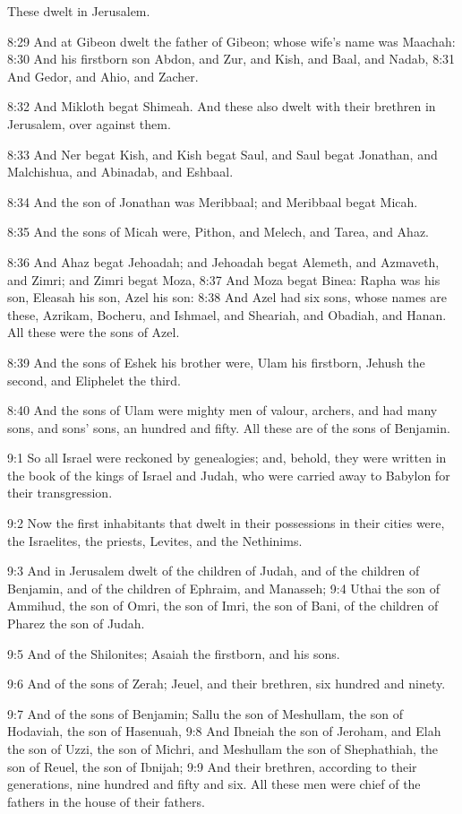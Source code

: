 These dwelt in Jerusalem.

8:29 And at Gibeon dwelt the father of Gibeon; whose wife's name was
Maachah: 8:30 And his firstborn son Abdon, and Zur, and Kish, and
Baal, and Nadab, 8:31 And Gedor, and Ahio, and Zacher.

8:32 And Mikloth begat Shimeah. And these also dwelt with their
brethren in Jerusalem, over against them.

8:33 And Ner begat Kish, and Kish begat Saul, and Saul begat Jonathan,
and Malchishua, and Abinadab, and Eshbaal.

8:34 And the son of Jonathan was Meribbaal; and Meribbaal begat Micah.

8:35 And the sons of Micah were, Pithon, and Melech, and Tarea, and
Ahaz.

8:36 And Ahaz begat Jehoadah; and Jehoadah begat Alemeth, and
Azmaveth, and Zimri; and Zimri begat Moza, 8:37 And Moza begat Binea:
Rapha was his son, Eleasah his son, Azel his son: 8:38 And Azel had
six sons, whose names are these, Azrikam, Bocheru, and Ishmael, and
Sheariah, and Obadiah, and Hanan. All these were the sons of Azel.

8:39 And the sons of Eshek his brother were, Ulam his firstborn,
Jehush the second, and Eliphelet the third.

8:40 And the sons of Ulam were mighty men of valour, archers, and had
many sons, and sons' sons, an hundred and fifty. All these are of the
sons of Benjamin.

9:1 So all Israel were reckoned by genealogies; and, behold, they were
written in the book of the kings of Israel and Judah, who were carried
away to Babylon for their transgression.

9:2 Now the first inhabitants that dwelt in their possessions in their
cities were, the Israelites, the priests, Levites, and the Nethinims.

9:3 And in Jerusalem dwelt of the children of Judah, and of the
children of Benjamin, and of the children of Ephraim, and Manasseh;
9:4 Uthai the son of Ammihud, the son of Omri, the son of Imri, the
son of Bani, of the children of Pharez the son of Judah.

9:5 And of the Shilonites; Asaiah the firstborn, and his sons.

9:6 And of the sons of Zerah; Jeuel, and their brethren, six hundred
and ninety.

9:7 And of the sons of Benjamin; Sallu the son of Meshullam, the son
of Hodaviah, the son of Hasenuah, 9:8 And Ibneiah the son of Jeroham,
and Elah the son of Uzzi, the son of Michri, and Meshullam the son of
Shephathiah, the son of Reuel, the son of Ibnijah; 9:9 And their
brethren, according to their generations, nine hundred and fifty and
six. All these men were chief of the fathers in the house of their
fathers.

